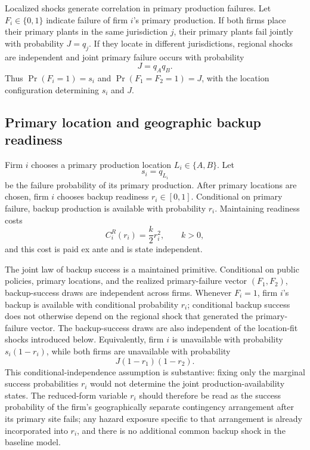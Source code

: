 Localized shocks generate correlation in primary production failures. Let $F_i\in\{0,1\}$ indicate failure of firm $i$'s primary production. If both firms place their primary plants in the same jurisdiction $j$, their primary plants fail jointly with probability $J=q_j$. If they locate in different jurisdictions, regional shocks are independent and joint primary failure occurs with probability
\begin{equation}
J=q_Aq_B.
\label{eq:joint-risk}
\end{equation}
Thus $\Pr(F_i=1)=s_i$ and $\Pr(F_1=F_2=1)=J$, with the location configuration determining $s_i$ and $J$.

\subsection{Primary location and geographic backup readiness}

Firm $i$ chooses a primary production location $L_i\in\{A,B\}$. Let
\begin{equation}
s_i=q_{L_i}
\end{equation}
be the failure probability of its primary production. After primary locations are chosen, firm $i$ chooses backup readiness $r_i\in[0,1]$. Conditional on primary failure, backup production is available with probability $r_i$. Maintaining readiness costs
\begin{equation}
C_i^R(r_i)=\frac{k}{2}r_i^2,
\qquad k>0,
\label{eq:backup-cost}
\end{equation}
and this cost is paid ex ante and is state independent.

The joint law of backup success is a maintained primitive. Conditional on public policies, primary locations, and the realized primary-failure vector $(F_1,F_2)$, backup-success draws are independent across firms. Whenever $F_i=1$, firm $i$'s backup is available with conditional probability $r_i$; conditional backup success does not otherwise depend on the regional shock that generated the primary-failure vector. The backup-success draws are also independent of the location-fit shocks introduced below. Equivalently, firm $i$ is unavailable with probability $s_i(1-r_i)$, while both firms are unavailable with probability
\begin{equation}
J(1-r_1)(1-r_2).
\label{eq:joint-unavailability}
\end{equation}
This conditional-independence assumption is substantive: fixing only the marginal success probabilities $r_i$ would not determine the joint production-availability states. The reduced-form variable $r_i$ should therefore be read as the success probability of the firm's geographically separate contingency arrangement after its primary site fails; any hazard exposure specific to that arrangement is already incorporated into $r_i$, and there is no additional common backup shock in the baseline model.

